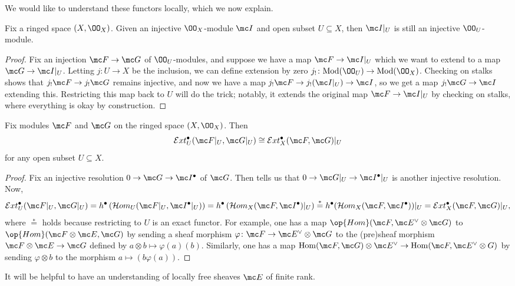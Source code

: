 \documentclass[../notes.tex]{subfiles}
\begin{document}
We would like to understand these functors locally, which we now explain.
\begin{lemma} \label{lem:restrict-injective-open}
	Fix a ringed space $(X,\OO_X)$. Given an injective $\OO_X$-module $\mc I$ and open subset $U\subseteq X$, then $\mc I|_U$ is still an injective $\OO_U$-module.
\end{lemma}
\begin{proof}
	Fix an injection $\mc F\to\mc G$ of $\OO_U$-modules, and suppose we have a map $\mc F\to\mc I|_U$ which we want to extend to a map $\mc G\to\mc I|_U$. Letting $j\colon U\to X$ be the inclusion, we can define extension by zero $j_!\colon\mathrm{Mod}(\OO_U)\to\mathrm{Mod}(\OO_X)$. Checking on stalks shows that $j_!\mc F\to j_!\mc G$ remains injective, and now we have a map $j_!\mc F\to j_!(\mc I|_U)\to\mc I$, so we get a map $j_!\mc G\to\mc I$ extending this. Restricting this map back to $U$ will do the trick; notably, it extends the original map $\mc F\to\mc I|_U$ by checking on stalks, where everything is okay by construction.
\end{proof}
\begin{proposition} \label{prop:restrict-ext}
	Fix modules $\mc F$ and $\mc G$ on the ringed space $(X,\OO_X)$. Then
	\[\mathcal Ext^\bullet_U(\mc F|_U,\mc G|_U)\cong\mathcal Ext^\bullet_X(\mc F,\mc G)|_U\]
	for any open subset $U\subseteq X$.
\end{proposition}
\begin{proof}
	Fix an injective resolution $0\to\mc G\to\mc I^\bullet$ of $\mc G$. Then  tells us that $0\to\mc G|_U\to\mc I^\bullet|_U$ is another injective resolution. Now,
	\[\mathcal Ext^\bullet_U(\mc F|_U,\mc G|_U)=h^\bullet\left(\mathcal Hom_U(\mc F|_U,\mc I^\bullet|_U)\right)=h^\bullet\left(\mathcal Hom_X(\mc F,\mc I^\bullet)|_U\right)\stackrel*=h^\bullet(\mathcal Hom_X(\mc F,\mc I^\bullet))|_U=\mathcal Ext_X^\bullet(\mc F,\mc G)|_U,\]
	where $\stackrel*=$ holds because restricting to $U$ is an exact functor. For example, one has a map $\op{Hom}(\mc F,\mc E^\lor\otimes\mc G)$ to $\op{Hom}(\mc F\otimes\mc E,\mc G)$ by sending a sheaf morphism $\varphi\colon\mc F\to\mc E^\lor\otimes\mc G$ to the (pre)sheaf morphism $\mc F\otimes\mc E\to\mc G$ defined by $a\otimes b\mapsto\varphi(a)(b)$. Similarly, one has a map $\mathrm{Hom}(\mc F,\mc G)\otimes\mc E^\lor\to\mathrm{Hom}(\mc F,\mc E^\lor\otimes G)$ by sending $\varphi\otimes b$ to the morphism $a\mapsto(b\varphi(a))$.
\end{proof}
It will be helpful to have an understanding of locally free sheaves $\mc E$ of finite rank.
\end{document}
